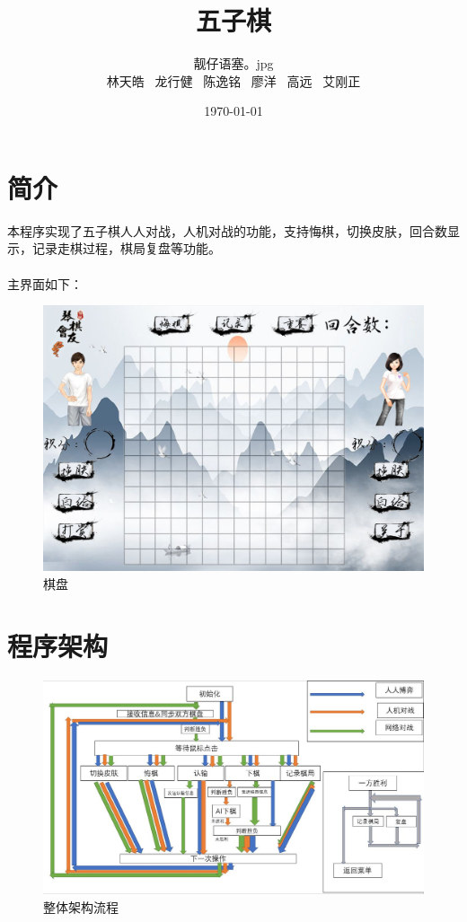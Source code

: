 \documentclass[UTF8]{ctexart}
\title{五子棋}
\author{靓仔语塞。jpg\\
林天皓 \ 龙行健 \ 陈逸铭 \ 廖洋 \ 高远 \ 艾刚正}
\date{\today}
\begin{document}
\maketitle
\newpage
\tableofcontents
\newpage
\section{简介}
本程序实现了五子棋人人对战，人机对战的功能，支持悔棋，切换皮肤，回合数显示，记录走棋过程，棋局复盘等功能。\\
\paragraph{}
主界面如下：
\begin{figure}[H]
    \centering
    \includegraphics[scale=0.4]{qipan.jpg}
    \caption{棋盘}
\end{figure}
\section{程序架构}
\begin{figure}[H]
    \centering
    \includegraphics[scale=0.48]{liuchengtu.jpg}
    \caption{整体架构流程}
\end{figure}
\end{document}
